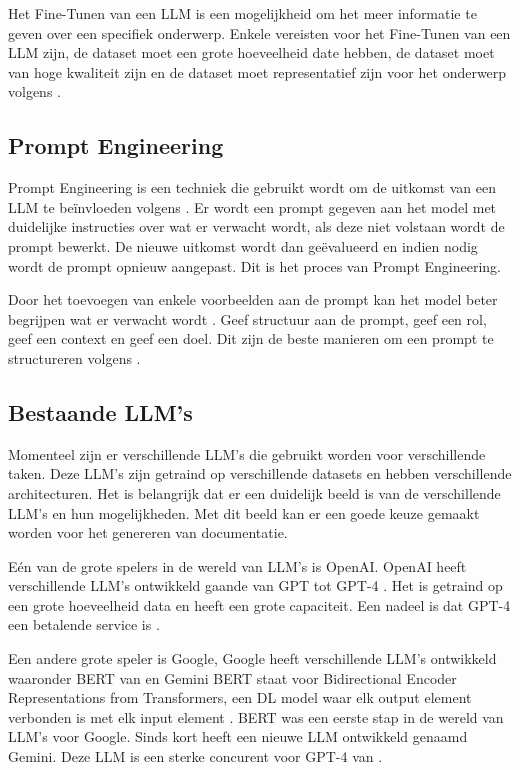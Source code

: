 Het Fine-Tunen van een LLM is een mogelijkheid om het meer informatie te geven over een specifiek onderwerp.
Enkele vereisten voor het Fine-Tunen van een LLM zijn, de dataset moet een grote hoeveelheid date hebben, de dataset moet van hoge kwaliteit zijn en de dataset moet representatief zijn voor het onderwerp volgens \textcite{Peckham2024}.

\subsection{Prompt Engineering}
\label{sec:prompt-engineering}

Prompt Engineering is een techniek die gebruikt wordt om de uitkomst van een LLM te beïnvloeden volgens \textcite{Google2023}.
Er wordt een prompt gegeven aan het model met duidelijke instructies over wat er verwacht wordt, als deze niet volstaan wordt de prompt bewerkt.
De nieuwe uitkomst wordt dan geëvalueerd en indien nodig wordt de prompt opnieuw aangepast.
Dit is het proces van Prompt Engineering.

Door het toevoegen van enkele voorbeelden aan de prompt kan het model beter begrijpen wat er verwacht wordt \autocite{OpenAi2024a}.
Geef structuur aan de prompt, geef een rol, geef een context en geef een doel. Dit zijn de beste manieren om een prompt te structureren volgens \autocite{Google2023}.

\subsection{Bestaande LLM's}
\label{sec:bestaande-llms}

Momenteel zijn er verschillende LLM's die gebruikt worden voor verschillende taken.
Deze LLM's zijn getraind op verschillende datasets en hebben verschillende architecturen.
Het is belangrijk dat er een duidelijk beeld is van de verschillende LLM's en hun mogelijkheden. 
Met dit beeld kan er een goede keuze gemaakt worden voor het genereren van documentatie.

Eén van de grote spelers in de wereld van LLM's is OpenAI. OpenAI heeft verschillende LLM's ontwikkeld gaande van GPT \autocite{RandfordEtAL2018} tot GPT-4 \autocite{OpenAI2023}.
Het is getraind op een grote hoeveelheid data en heeft een grote capaciteit.
Een nadeel is dat GPT-4 een betalende service is \autocite{OpenAI2023}.

Een andere grote speler is Google, Google heeft verschillende LLM's ontwikkeld waaronder BERT van \textcite{DevlinEtAl2019} en Gemini \autocite{Google2024}
BERT staat voor Bidirectional Encoder Representations from Transformers, een DL model waar elk output element verbonden is met elk input element \autocite{HashemiPour2024}.
BERT was een eerste stap in de wereld van LLM's voor Google. Sinds kort heeft \textcite{Google2024} een nieuwe LLM ontwikkeld genaamd Gemini.
Deze LLM is een sterke concurent voor GPT-4 van \textcite{OpenAI2023}. 

